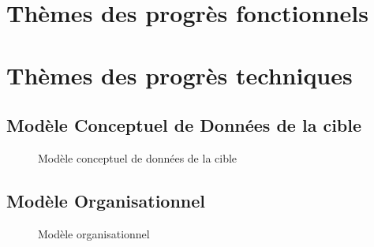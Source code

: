 

\newcommand{\mainTitle}{\'Etude préalable - SPIE}
\newcommand{\secondTitle}{Spécification du SI cible}
\newcommand{\documentRef}{DEB-SSIC/4401/1}





\tableofcontents
\listoffigures
\listoftables
\newpage

\part{Thèmes des progrès fonctionnels}
\setcounter{section}{0}


\part{Thèmes des progrès techniques}
\setcounter{section}{0}



\appendix
\chapter{Modèle Conceptuel de Données de la cible}

\begin{figure}[H]
    \label{fig-mcd-cible}
    \noindent{}
    \caption{Modèle conceptuel de données de la cible}
\end{figure}

\chapter{Modèle Organisationnel}

\begin{figure}[H]
    \label{fig-organisationnel}
    \noindent{}
    \caption{Modèle organisationnel}
\end{figure}

